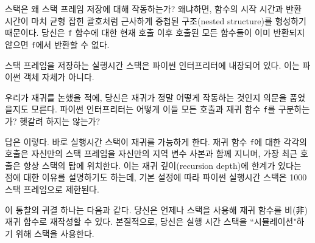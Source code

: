 \documentclass[a4paper, chapter]{oblivoir}
\begin{document}
스택은 왜 스택 프레임 저장에 대해 작동하는가? 왜냐하면, 함수의 시작 시간과 반환 시간이 마치 균형 잡힌 괄호처럼 근사하게 중첩된 구조(nested structure)를 형성하기 때문이다.  당신은 \texttt{f} 함수에 대한 현재 호출 이후 호출된 모든 함수들이 이미 반환되지 않으면 \texttt{f}에서 반환할 수 없다.

스택 프레임을 저장하는 실행시간 스택은 파이썬 인터프리터에 내장되어 있다. 이는 파이썬 객체 자체가 아니다.

우리가 재귀를 논했을 적에, 당신은 재귀가 정말 어떻게 작동하는 것인지 의문을 품었을지도 모른다. 파이썬 인터프리터는 어떻게 이들 모든 호출과 재귀 함수 \texttt{f}를 구분하는가? 헷갈려 하지는 않는가?

답은 이렇다. 바로 실행시간 스택이 재귀를 가능하게 한다. 재귀 함수 \texttt{f}에 대한 각각의 호출은 자신만의 스택 프레임을 자신만의 지역 변수 사본과 함께 지니며, 가장 최근 호출은 항상 스택의 탑에 위치한다. 이는 재귀 깊이(recursion depth)에 한계가 있다는 점에 대한 이유를 설명하기도 하는데, 기본 설정에 따라 파이썬 실행시간 스택은 1000 스택 프레임으로 제한된다.

이 통찰의 귀결 하나는 다음과 같다. 당신은 언제나 스택을 사용해 재귀 함수를 비(非)재귀 함수로 재작성할 수 있다. 본질적으로, 당신은 실행 시간 스택을 ``시뮬레이션"하기 위해 스택을 사용한다. 
\end{document}
